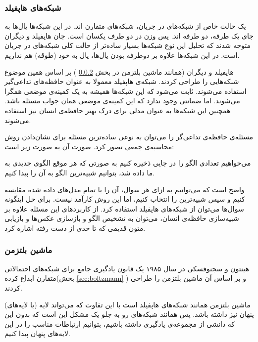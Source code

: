 \documentclass[11pt,a4paper,twocolumn]{article}
\begin{document}
\subsubsection{شبکه‌های هاپفیلد}
\label{sec:hopfield}
یک حالت خاص از شبکه‌های در جریان، شبکه‌های متقارن اند. در این شبکه‌ها یال‌ها به جای یک طرفه، دو طرفه اند. پس وزن در دو طرف یکسان است. جان هاپفیلد و دیگران متوجه شدند که تحلیل این نوع شبکه‌ها بسیار ساده‌تر از حالت کلی شبکه‌های در جریان است. در این شبکه‌ها علاوه بر دوطرفه بودن یال‌ها، یال به خود (طوقه) هم نداریم.

هاپفیلد و
دیگران (همانند ماشین بلتزمن در بخش 
\ref{sec:boltzmann_machine}
)
بر اساس همین موضوع شبکه‌هایی را طراحی کردند. شبکه‌ی هاپفیلد معمولا به عنوان 
حافظه‌های تداعی‌گیر
استفاده می‌شوند. ثابت می‌شود که این شبکه‌ها همیشه به یک
کمینه‌ی موضعی
همگرا می‌شوند. اما ضمانتی وجود ندارد که این کمینه‌ی موضعی همان جواب مسئله باشد. همچنین این شبکه‌ها به عنوان مدلی برای درک بهتر حافظه‌ی انسان نیز استفاده می‌شوند.\cite{wiki-hopfield_net}

مسئله‌ی حافظه‌ی تداعی‌گر را می‌توان به نوعی ساده‌ترین مسئله برای نشان‌دادن روش محاسبه‌ی جمعی تصور کرد. صورت آن به صورت زیر است:

می‌خواهیم تعدادی الگو را در جایی ذخیره کنیم به صورتی که هر موقع الگو‌ی جدیدی به ما داده شد، بتوانیم شبیه‌ترین الگو به آن را پیدا کنیم.

واضح است که می‌توانیم به ازای هر سوال، آن را با تمام مدل‌های داده شده مقایسه کنیم و سپس شبیه‌ترین را انتخاب کنیم، اما این روش کارآمد نیست. برای حل اینگونه سوال‌ها می‌توان از شبکه‌های هاپفیلد استفاده کرد. از کاربرد‌های این مسئله علاوه بر شبیه‌سازی حافظه‌ی انسان، می‌توان به تشخیص الگو و بازسازی عکس‌ها و بازیابی متون قدیمی که تا حدی از دست رفته اشاره کرد.\cite[ص-۱۱و۱۲]{hertz}
\subsubsection{ماشین بلتزمن}
\label{sec:boltzmann_machine}
هینتون و سجنوفسکی در سال ۱۹۸۵ یک قانون یادگیری جامع برای	شبکه‌های احتمالاتی متقارن ابداع کرده(بخش
\ref{sec:boltzmann}
) و بر اساس آن ماشین بلتزمن را طراحی کردند.

ماشین بلتزمن همانند شبکه‌های هاپفیلد است با این تفاوت که می‌تواند لایه (یا لایه‌های) پنهان نیز داشته باشد. پس همانند شبکه‌های رو به جلو یک مشکل این است که بدون این که دانشی از مجموعه‌ی یادگیری داشته باشیم، بتوانیم ارتباطات مناسب را در این لایه‌های پنهان پیدا کنیم.
\end{document}
